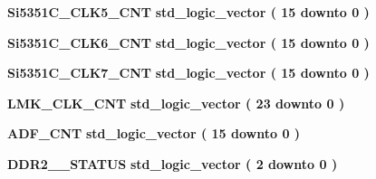 \begin{DoxyCompactItemize}
\item 
{\bf Si5351\+C\+\_\+\+C\+L\+K5\+\_\+\+C\+NT} {\bfseries {\bfseries \textcolor{comment}{std\+\_\+logic\+\_\+vector}\textcolor{vhdlchar}{ }\textcolor{vhdlchar}{(}\textcolor{vhdlchar}{ }\textcolor{vhdlchar}{ } \textcolor{vhdldigit}{15} \textcolor{vhdlchar}{ }\textcolor{keywordflow}{downto}\textcolor{vhdlchar}{ }\textcolor{vhdlchar}{ } \textcolor{vhdldigit}{0} \textcolor{vhdlchar}{ }\textcolor{vhdlchar}{)}\textcolor{vhdlchar}{ }}} 
\item 
{\bf Si5351\+C\+\_\+\+C\+L\+K6\+\_\+\+C\+NT} {\bfseries {\bfseries \textcolor{comment}{std\+\_\+logic\+\_\+vector}\textcolor{vhdlchar}{ }\textcolor{vhdlchar}{(}\textcolor{vhdlchar}{ }\textcolor{vhdlchar}{ } \textcolor{vhdldigit}{15} \textcolor{vhdlchar}{ }\textcolor{keywordflow}{downto}\textcolor{vhdlchar}{ }\textcolor{vhdlchar}{ } \textcolor{vhdldigit}{0} \textcolor{vhdlchar}{ }\textcolor{vhdlchar}{)}\textcolor{vhdlchar}{ }}} 
\item 
{\bf Si5351\+C\+\_\+\+C\+L\+K7\+\_\+\+C\+NT} {\bfseries {\bfseries \textcolor{comment}{std\+\_\+logic\+\_\+vector}\textcolor{vhdlchar}{ }\textcolor{vhdlchar}{(}\textcolor{vhdlchar}{ }\textcolor{vhdlchar}{ } \textcolor{vhdldigit}{15} \textcolor{vhdlchar}{ }\textcolor{keywordflow}{downto}\textcolor{vhdlchar}{ }\textcolor{vhdlchar}{ } \textcolor{vhdldigit}{0} \textcolor{vhdlchar}{ }\textcolor{vhdlchar}{)}\textcolor{vhdlchar}{ }}} 
\item 
{\bf L\+M\+K\+\_\+\+C\+L\+K\+\_\+\+C\+NT} {\bfseries {\bfseries \textcolor{comment}{std\+\_\+logic\+\_\+vector}\textcolor{vhdlchar}{ }\textcolor{vhdlchar}{(}\textcolor{vhdlchar}{ }\textcolor{vhdlchar}{ } \textcolor{vhdldigit}{23} \textcolor{vhdlchar}{ }\textcolor{keywordflow}{downto}\textcolor{vhdlchar}{ }\textcolor{vhdlchar}{ } \textcolor{vhdldigit}{0} \textcolor{vhdlchar}{ }\textcolor{vhdlchar}{)}\textcolor{vhdlchar}{ }}} 
\item 
{\bf A\+D\+F\+\_\+\+C\+NT} {\bfseries {\bfseries \textcolor{comment}{std\+\_\+logic\+\_\+vector}\textcolor{vhdlchar}{ }\textcolor{vhdlchar}{(}\textcolor{vhdlchar}{ }\textcolor{vhdlchar}{ } \textcolor{vhdldigit}{15} \textcolor{vhdlchar}{ }\textcolor{keywordflow}{downto}\textcolor{vhdlchar}{ }\textcolor{vhdlchar}{ } \textcolor{vhdldigit}{0} \textcolor{vhdlchar}{ }\textcolor{vhdlchar}{)}\textcolor{vhdlchar}{ }}} 
\item 
{\bf D\+D\+R2\+\_\+\_\+\+S\+T\+A\+T\+US} {\bfseries {\bfseries \textcolor{comment}{std\+\_\+logic\+\_\+vector}\textcolor{vhdlchar}{ }\textcolor{vhdlchar}{(}\textcolor{vhdlchar}{ }\textcolor{vhdlchar}{ } \textcolor{vhdldigit}{2} \textcolor{vhdlchar}{ }\textcolor{keywordflow}{downto}\textcolor{vhdlchar}{ }\textcolor{vhdlchar}{ } \textcolor{vhdldigit}{0} \textcolor{vhdlchar}{ }\textcolor{vhdlchar}{)}\textcolor{vhdlchar}{ }}} 

\end{DoxyCompactItemize}
